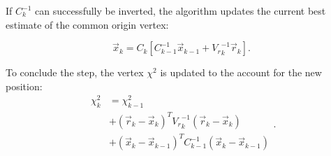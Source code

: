 

If $C_k^{-1}$ can successfully be inverted, the algorithm updates the current best estimate of the common origin vertex:

\begin{equation}
\vec{x}_k = C_k \left[
	C_{k-1}^{-1} \vec{x}_{k-1}
	+ {V_r}_k^{-1} \vec{r}_k
\right].
\label{eq:VF_new_vertex_final}
\end{equation}

To conclude the step, the vertex $\chi^2$ is updated to the account for the new position:
\begin{equation}
\begin{aligned}
	\chi^2_k &= \chi^2_{k-1} \\
	&+
	{\left(\vec{r}_{k} - \vec{x}_k\right)}^T  {V_r}_k^{-1} \left(\vec{r}_{k} - \vec{x}_k \right) \\
	&+
	{\left(\vec{x}_k - \vec{x}_{k-1}\right)}^T  C_{k-1}^{-1} \left(\vec{x}_k - \vec{x}_{k-1}\right) \\
\end{aligned}.
\label{eq:VF_vertex_chi2_final}
\end{equation}

